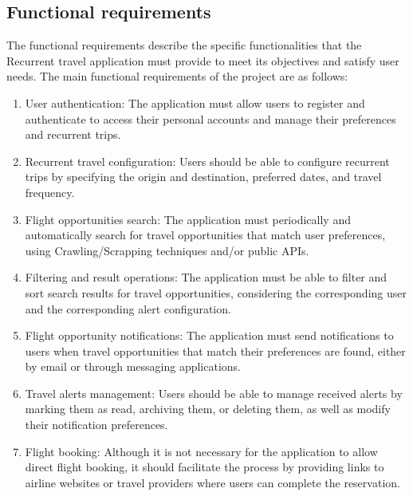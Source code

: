 \documentclass[../memory.tex]{subfiles}
\begin{document}
\subsection{Functional requirements}
The functional requirements describe the specific functionalities that the
Recurrent travel application must provide to meet its objectives and satisfy
user needs. The main functional requirements of the project are as follows:
\begin{enumerate}
	\item User authentication: The application must allow users to register and
	      authenticate to access their personal accounts and manage their
	      preferences and recurrent trips.
	\item Recurrent travel configuration: Users should be able to configure
	      recurrent trips by specifying the origin and destination, preferred dates,
	      and travel frequency.
	\item Flight opportunities search: The application must periodically
	      and automatically search for travel opportunities that match user
	      preferences, using Crawling/Scrapping techniques and/or public APIs.
	\item Filtering and result operations: The application must be able to
	      filter and sort search results for travel opportunities, considering the
	      corresponding user and the corresponding alert configuration.
	\item Flight opportunity notifications: The application must send
	      notifications to users when travel opportunities that match their
	      preferences are found, either by email or through messaging applications.
	\item Travel alerts management: Users should be able to manage received alerts by
	      marking them as read, archiving them, or deleting them, as well as modify
	      their notification preferences.
	\item Flight booking: Although it is not necessary for the application to
	      allow direct flight booking, it should facilitate the process by providing
	      links to airline websites or travel providers where users can complete the
	      reservation.
\end{enumerate}
\end{document}

